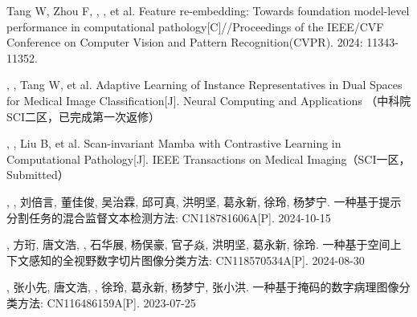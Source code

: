 {
\small
\setlength{\baselineskip}{20pt}
\begin{enumerate}[label={[\arabic*]}, leftmargin=*]
\item Tang W, Zhou F, , , et al. Feature re-embedding: Towards foundation model-level performance in computational pathology[C]//Proceedings of the IEEE/CVF Conference on Computer Vision and Pattern Recognition(CVPR). 2024: 11343-11352. 
\item {}, , Tang W,  et al. Adaptive Learning of Instance Representatives in Dual Spaces for Medical Image Classification[J]. Neural Computing and Applications （中科院SCI二区，已完成第一次返修）
\item {}, , Liu B, et al. Scan-invariant Mamba with Contrastive Learning in Computational Pathology[J]. IEEE Transactions on Medical Imaging（SCI一区，Submitted）
\item {}, , 刘倍言, 董佳俊, 吴治霖, 邱可真, 洪明坚, 葛永新, 徐玲, 杨梦宁. 一种基于提示分割任务的混合监督文本检测方法: CN118781606A[P]. 2024-10-15
\item {}, 方珩, 唐文浩, , 石华展, 杨俣豪, 官子焱, 洪明坚, 葛永新, 徐玲. 一种基于空间上下文感知的全视野数字切片图像分类方法: CN118570534A[P]. 2024-08-30
\item {},  张小先, 唐文浩, , 徐玲, 葛永新, 杨梦宁, 张小洪. 一种基于掩码的数字病理图像分类方法: CN116486159A[P]. 2023-07-25
\end{enumerate}
}


